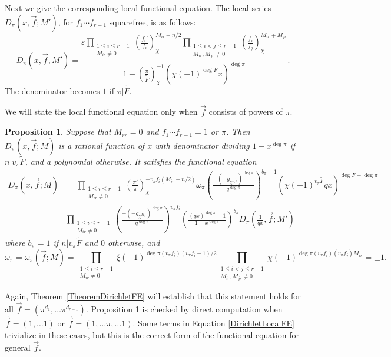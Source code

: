 \documentclass[11pt,letterpaper]{article}
\newtheorem{prop}[theorem]{Proposition}
\theoremstyle{definition}
\theoremstyle{remark}
\numberwithin{equation}{section}
\theoremstyle{dotless}
\newcommand{\res}[2]{\left(\frac{#1}{#2}\right)}
\renewcommand{\tilde}{\widetilde}
\begin{document}
Next we give the corresponding local functional equation. The local series $D_{\pi}(x, \vec{f}; M')$, for $f_1\cdots f_{r-1}$ squarefree, is as follows:
\begin{equation*}
D_{\pi}(x, \vec{f}, M')= \frac{\varepsilon \prod\limits_{\substack{1 \leq i \leq r-1 \\ M_{ir} \neq 0}} \res{f_i'}{f_i}_{\chi}^{M_{ir}+n/2}
\prod\limits_{\substack{1 \leq i<j \leq r-1 \\ M_{ir}, M_{jr} \neq 0}} \res{f_i}{f_j}_{\chi}^{M_{ir}+M_{jr}}}{1-\res{\pi}{\tilde{F}}^{-1}_{\chi} (\chi(-1)^{\deg \tilde{F}} x)^{\deg \pi}}.
\end{equation*}
The denominator becomes $1$ if $\pi | \tilde{F}$.

We will state the local functional equation only when $\vec{f}$ consists of powers of $\pi$. 
\begin{prop} \label{PropDirichletLocalFE}
Suppose that $M_{rr}=0$ and $f_1 \cdots f_{r-1}=1$ or $\pi$. Then $D_\pi(x, \vec{f}; M)$ is a rational function of $x$ with denominator dividing $1-x^{\deg \pi}$ if $n | v_\pi \tilde{F}$, and a polynomial otherwise. It satisfies the functional equation 
\begin{equation} \label{DirichletLocalFE}
\begin{split}
D_{\pi}(x, \vec{f}; M) &= \prod_{\substack{1 \leq i \leq r-1 \\ M_{ir} \neq 0}} \res{\pi'}{\pi}_{\chi}^{-v_\pi f_i(M_{ir}+n/2)} \omega_\pi \left(\frac{-(-g_{\chi^{v_{\pi} \tilde{F}}})^{\deg \pi}}{q^{\deg\pi}}\right)^{b_{\pi}-1} (\chi(-1)^{v_\pi\tilde{F}}qx)^{\deg F-\deg \pi} \\
&\prod_{\substack{1 \leq i \leq r-1 \\ M_{ir} \neq 0}} \left(\frac{-(-g_{\chi^{M_{ir}}})^{\deg \pi}}{q^{\deg \pi}}\right)^{v_\pi f_i} \left( \frac{(qx)^{\deg \pi}-1}{1-x^{\deg \pi}}\right)^{b_{\pi}} D_{\pi}\left(\frac{1}{qx}, \vec{f}; M'\right)
\end{split}
\end{equation}
where $b_{\pi}=1$ if $n | v_{\pi} \tilde{F}$ and $0$ otherwise, and 
\begin{equation} \label{LocalRootNumberSign}
\omega_\pi =\omega_\pi(\vec{f}; M)= \prod_{\substack{1 \leq i \leq r-1 \\ M_{ir} \neq 0}} \xi(-1)^{\deg \pi (v_\pi f_i)(v_\pi f_i-1)/2} \prod_{\substack{1 \leq i<j \leq r-1 \\ M_{ir}, M_{jr} \neq 0}} \chi(-1)^{\deg \pi(v_\pi f_i)(v_\pi f_j) M_{ir} } = \pm 1.
\end{equation}
\end{prop}
\noindent Again, Theorem \ref{TheoremDirichletFE} will establish that this statement holds for all $\vec{f}=(\pi^{d_1}, \ldots \pi^{d_{r-1}})$. Proposition \ref{PropDirichletLocalFE} is checked by direct computation when $\vec{f}=(1, \ldots 1)$ or $\vec{f} = (1, \ldots \pi, \ldots 1)$. Some terms in Equation \eqref{DirichletLocalFE} trivialize in these cases, but this is the correct form of the functional equation for general $\vec{f}$.
\end{document}
